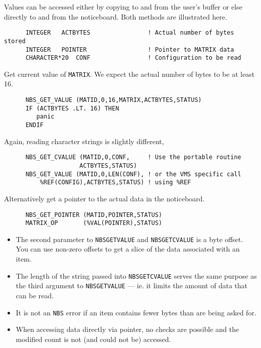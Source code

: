 \documentclass[twoside,11pt]{article}
\renewcommand{\_}{\texttt{\symbol{95}}}
\begin{document}
Values can be accessed either by copying to and from the user's buffer or else
directly to and from the noticeboard. Both methods are illustrated here.

\begin {verbatim}
      INTEGER   ACTBYTES                ! Actual number of bytes stored
      INTEGER   POINTER                 ! Pointer to MATRIX data
      CHARACTER*20  CONF                ! Configuration to be read
\end{verbatim}

Get current value of {\tt MATRIX}. We expect the actual number of bytes to
be at least 16.

\begin {verbatim}
      NBS_GET_VALUE (MATID,0,16,MATRIX,ACTBYTES,STATUS)
      IF (ACTBYTES .LT. 16) THEN
         panic
      ENDIF
\end{verbatim}

Again, reading character strings is slightly different,

\begin {verbatim}
      NBS_GET_CVALUE (MATID,0,CONF,     ! Use the portable routine
                     ACTBYTES,STATUS)
      NBS_GET_VALUE (MATID,0,LEN(CONF), ! or the VMS specific call
\end{verbatim}

Alternatively get a pointer to the actual data in the noticeboard.

\begin {verbatim}
      NBS_GET_POINTER (MATID,POINTER,STATUS)
      MATRIX_OP       (%
\end{verbatim}

\begin {itemize}
\item The second parameter to {\tt NBS\_GET\_VALUE} and {\tt NBS\_GET\_CVALUE}
is a byte offset. You can use non-zero offsets to get a slice of the
data associated with an item.
\item The length of the string passed into {\tt NBS\_GET\_CVALUE} serves
the same purpose as the third argument to {\tt NBS\_GET\_VALUE} --- ie. it
limits the amount of data that can be read.
\item It is not an {\tt NBS} error if an item contains fewer bytes than are
being asked for.
\item When accessing data directly via pointer, no checks are possible and the
modified count is not (and could not be) accessed.
\end {itemize}
\end{document}
